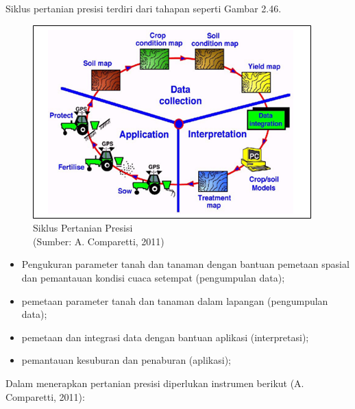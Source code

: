 Siklus pertanian presisi terdiri dari tahapan seperti Gambar 2.46.
\begin{figure}[H]
	\vspace{-0.1cm}
	\begin{center}
		\includegraphics[width=1\columnwidth]{bab2/Gambar/Picture46.png}
	\end{center}
	\vspace{-0.2cm}
	\captionsetup{justification=centering}
	\caption{Siklus Pertanian Presisi\\(Sumber: A. Comparetti, 2011)}\label{img:Siklus-Pertanian-Presisi}
\end{figure}
\begin{itemize}
	\item Pengukuran parameter tanah dan tanaman dengan bantuan pemetaan spasial dan pemantauan kondisi cuaca setempat (pengumpulan data);
	
	\item pemetaan parameter tanah dan tanaman dalam lapangan (pengumpulan data);
	
	\item pemetaan dan integrasi data dengan bantuan aplikasi (interpretasi);
	
	\item pemantauan kesuburan dan penaburan (aplikasi);
	
\end{itemize}
Dalam menerapkan pertanian presisi diperlukan instrumen berikut (A. Comparetti, 2011):

